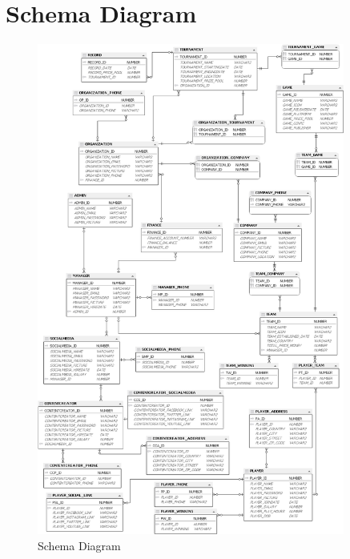 \section{Schema Diagram}
\hrulefill
\begin{figure}[H]
    \centering
    \includegraphics[width=0.9\textwidth]{diagrams/Diagram_schema_1.png}
    \caption{Schema Diagram}
    \label{fig:Schema Diagram}
\end{figure}